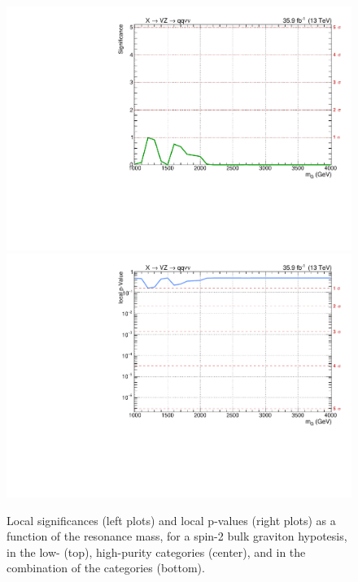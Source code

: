 \begin{figure}[!htb]
\begin{center}
     \includegraphics[width=.495\textwidth]{plotsAlpha_tesi/Limits/Significance_XZZInv_XVZnn.pdf}%
     \includegraphics[width=.495\textwidth]{plotsAlpha_tesi/Limits/pValue_XZZInv_XVZnn.pdf}

  \end{center}
  \caption{Local significances (left plots) and local p-values (right plots) as a function of the resonance mass, for a spin-2 bulk graviton hypotesis, in the low- (top), high-purity categories (center), and in the combination of the categories (bottom).}
  \label{fig:Signif_XZZInv}
\end{figure}

